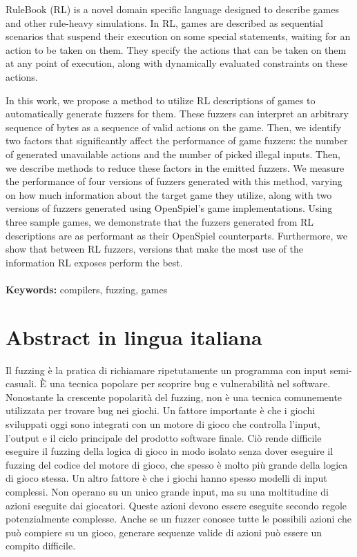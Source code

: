 \documentclass{Configuration_Files/PoliMi3i_thesis}
\begin{document}
RuleBook (RL) is a novel domain specific language designed to describe games and other rule-heavy simulations.
In RL, games are described as sequential scenarios that suspend their execution on some special statements, waiting for an action to be taken on them.
They specify the actions that can be taken on them at any point of execution, along with dynamically evaluated constraints on these actions.

In this work, we propose a method to utilize RL descriptions of games to automatically generate fuzzers for them.
These fuzzers can interpret an arbitrary sequence of bytes as a sequence of valid actions on the game.
Then, we identify two factors that significantly affect the performance of game fuzzers: the number of generated unavailable actions and the number of picked illegal inputs.
Then, we describe methods to reduce these factors in the emitted fuzzers.
We measure the performance of four versions of fuzzers generated with this method, varying on how much information about the target game they utilize, along with two versions of fuzzers generated using OpenSpiel's game implementations.
Using three sample games, we demonstrate that the fuzzers generated from RL descriptions are as performant as their OpenSpiel counterparts.
Furthermore, we show that between RL fuzzers, versions that make the most use of the information RL exposes perform the best.
\\
\\
\textbf{Keywords:} compilers, fuzzing, games

\chapter*{Abstract in lingua italiana}
Il fuzzing è la pratica di richiamare ripetutamente un programma con input semi-casuali.
È una tecnica popolare per scoprire bug e vulnerabilità nel software.
Nonostante la crescente popolarità del fuzzing, non è una tecnica comunemente utilizzata per trovare bug nei giochi.
Un fattore importante è che i giochi sviluppati oggi sono integrati con un motore di gioco che controlla l'input, l'output e il ciclo principale del prodotto software finale.
Ciò rende difficile eseguire il fuzzing della logica di gioco in modo isolato senza dover eseguire il fuzzing del codice del motore di gioco, che spesso è molto più grande della logica di gioco stessa.
Un altro fattore è che i giochi hanno spesso modelli di input complessi. Non operano su un unico grande input, ma su una moltitudine di azioni eseguite dai giocatori.
Queste azioni devono essere eseguite secondo regole potenzialmente complesse.
Anche se un fuzzer conosce tutte le possibili azioni che può compiere su un gioco, generare sequenze valide di azioni può essere un compito difficile.
\end{document}
